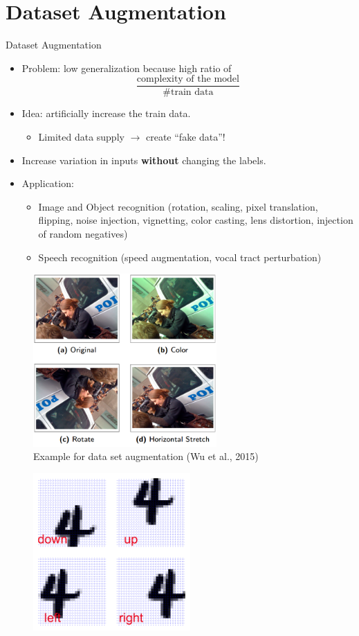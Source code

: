 \section{Dataset Augmentation}
\begin{vbframe}{Dataset Augmentation}
  \begin{itemize}
    \item Problem: low generalization because high ratio of $$\frac{\text{complexity of the model}}{\text{\#train data}}$$
    \item Idea: artificially increase the train data.
      \begin{itemize}
        \item Limited data supply $\rightarrow$ create \enquote{fake data}! 
      \end{itemize}
    \item Increase variation in inputs \textbf{without} changing the labels.
    \item Application:
      \begin{itemize}
        \item Image and Object recognition (rotation, scaling, pixel translation, flipping, noise injection, vignetting, color casting, lens distortion, injection of random negatives)
        \item Speech recognition (speed augmentation, vocal tract perturbation)
      \end{itemize}
  \end{itemize}
\framebreak
  \begin{figure}
    \centering
      \includegraphics[width=7cm]{figure/data_augmentation_1.png}
      \caption{Example for data set augmentation (Wu et al., 2015)}
  \end{figure}
\framebreak
  \begin{figure}
    \centering
      \includegraphics[width=6cm]{figure/data_augmentation_2.png}

\end{figure}
\end{vbframe}
